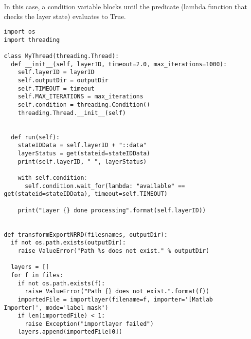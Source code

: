 \documentclass[fleqn,11pt,openany]{book}
\begin{document}
In this case, a condition variable blocks until the predicate (lambda function that checks the layer state) evaluates to True.

\begin{lstlisting}[frame=single]
import os
import threading

class MyThread(threading.Thread):
  def __init__(self, layerID, timeout=2.0, max_iterations=1000):
    self.layerID = layerID
    self.outputDir = outputDir
    self.TIMEOUT = timeout
    self.MAX_ITERATIONS = max_iterations
    self.condition = threading.Condition()
    threading.Thread.__init__(self)


  def run(self):
    stateIDData = self.layerID + "::data"
    layerStatus = get(stateid=stateIDData)
    print(self.layerID, " ", layerStatus)

    with self.condition:
      self.condition.wait_for(lambda: "available" == get(stateid=stateIDData), timeout=self.TIMEOUT)

    print("Layer {} done processing".format(self.layerID))


def transformExportNRRD(filesnames, outputDir):
  if not os.path.exists(outputDir):
    raise ValueError("Path %s does not exist." % outputDir)

  layers = []
  for f in files:
    if not os.path.exists(f):
      raise ValueError("Path {} does not exist.".format(f))
    importedFile = importlayer(filename=f, importer='[Matlab Importer]', mode='label_mask')
    if len(importedFile) < 1:
      raise Exception("importlayer failed")
    layers.append(importedFile[0])
\end{lstlisting}
\end{document}
